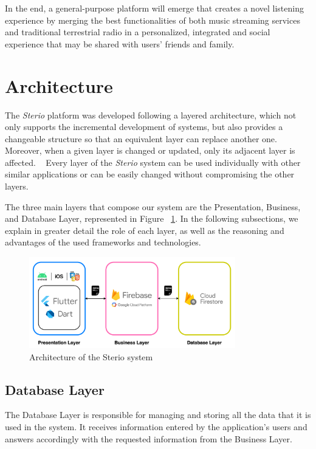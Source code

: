 In the end, a general-purpose platform will emerge that creates a novel listening experience by merging the best functionalities of both music streaming services and traditional terrestrial radio in a personalized, integrated and social experience that may be shared with users' friends and family.




\section{Architecture}

The \textit{Sterio} platform was developed following a layered architecture, which not only supports the incremental development of systems, but also provides a changeable structure so that an equivalent layer can replace another one. Moreover, when a given layer is changed or updated, only its adjacent layer is affected. ~\cite{Aarsten} Every layer of the \textit{Sterio} system can be used individually with other similar applications or can be easily changed without compromising the other layers. 

The three main layers that compose our system are the Presentation, Business, and Database Layer, represented in Figure ~\ref{fig:arc}. In the following subsections, we explain in greater detail the role of each layer, as well as the reasoning and advantages of the used frameworks and technologies. 

\begin{figure}[h]
\centering
\includegraphics[width=0.8\textwidth]{./Images/arc.png}
\caption{Architecture of the Sterio system}
\label{fig:arc}
\end{figure}

\subsection{Database Layer}

The Database Layer is responsible for managing and storing all the data that it is used in the system. It receives information entered by the application's users and answers accordingly with the requested information from the Business Layer. ~\cite{Aarsten}

